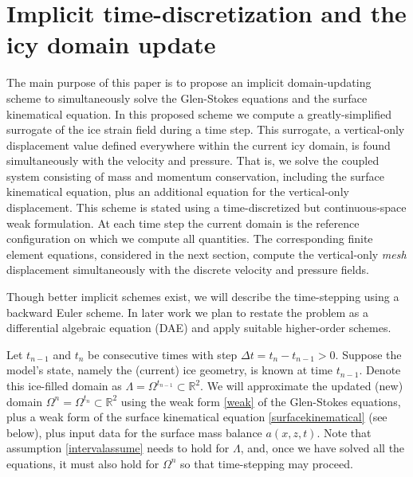 \documentclass[letterpaper,final,12pt,reqno]{amsart}
\newcommand{\RR}{\mathbb{R}}
\begin{document}
\section{Implicit time-discretization and the icy domain update} \label{sec:implicitstep}

The main purpose of this paper is to propose an implicit domain-updating scheme to simultaneously solve the Glen-Stokes equations and the surface kinematical equation.  In this proposed scheme we compute a greatly-simplified surrogate of the ice strain field during a time step.  This surrogate, a vertical-only displacement value defined everywhere within the current icy domain, is found simultaneously with the velocity and pressure.  That is, we solve the coupled system consisting of mass and momentum conservation, including the surface kinematical equation, plus an additional equation for the vertical-only displacement.  This scheme is stated using a time-discretized but continuous-space weak formulation.  At each time step the current domain is the reference configuration on which we compute all quantities.  The corresponding finite element equations, considered in the next section, compute the vertical-only \emph{mesh} displacement simultaneously with the discrete velocity and pressure fields.

Though better implicit schemes exist, we will describe the time-stepping using a backward Euler scheme.  In later work we plan to restate the problem as a differential algebraic equation (DAE) and apply suitable higher-order schemes.

Let $t_{n-1}$ and $t_n$ be consecutive times with step $\Delta t = t_n - t_{n-1} > 0$.  Suppose the model's state, namely the (current) ice geometry, is known at time $t_{n-1}$.  Denote this ice-filled domain as $\Lambda = \Omega^{t_{n-1}} \subset \RR^2$.  We will approximate the updated (new) domain $\Omega^n = \Omega^{t_n} \subset \RR^2$ using the weak form \eqref{weak} of the Glen-Stokes equations, plus a weak form of the surface kinematical equation \eqref{surfacekinematical} (see below), plus input data for the surface mass balance $a(x,z,t)$.  Note that assumption \eqref{intervalassume} needs to hold for $\Lambda$, and, once we have solved all the equations, it must also hold for $\Omega^n$ so that time-stepping may proceed.
\end{document}
